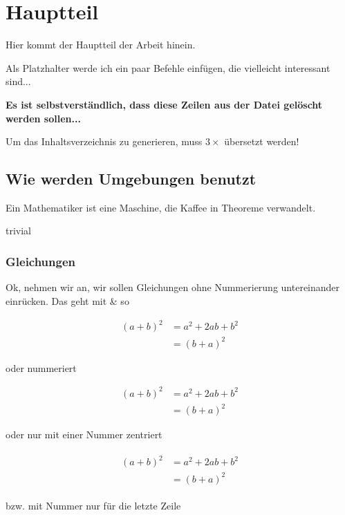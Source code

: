 \chapter{Hauptteil}

Hier kommt der Hauptteil der Arbeit hinein.

\noindent
Als Platzhalter werde ich ein paar Befehle einf\"ugen, die vielleicht interessant sind...

\noindent
\textbf{Es ist selbstverst\"andlich, dass diese Zeilen aus der Datei gel\"oscht werden sollen...}

Um das Inhaltsverzeichnis zu generieren, muss $3\times$ \"ubersetzt werden! 

\section{Wie werden Umgebungen benutzt}
\begin{Satz}[Kaffeetheorem]
Ein Mathematiker ist eine Maschine, die Kaffee in Theoreme verwandelt. 
\end{Satz}

\begin{Beweis}
trivial
\end{Beweis}

\subsection{Gleichungen}
Ok, nehmen wir an, wir sollen Gleichungen ohne Nummerierung untereinander einr\"ucken. Das geht mit {\&} so

\begin{align*}
\left(a+b\right)^2&= a^2+2ab+b^2\\
&= (b+a)^2
\end{align*}


oder nummeriert

\begin{align}
\left(a+b\right)^2&=a^2+2ab+b^2\\
&= (b+a)^2
\end{align}

oder nur mit einer Nummer zentriert

\begin{align}
\begin{aligned}
\left(a+b\right)^2&= a^2+2ab+b^2\\
&=(b+a)^2
\end{aligned}
\end{align}

bzw. mit Nummer nur f\"ur die letzte Zeile

